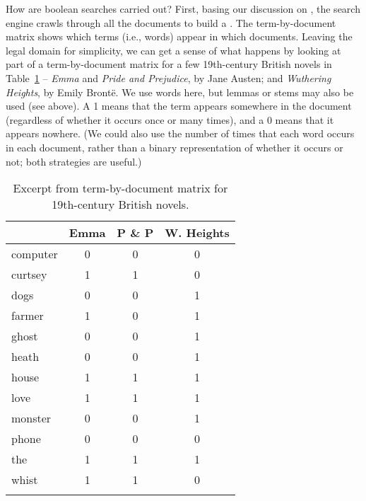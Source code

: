 How are boolean searches carried out?  First, basing our discussion on  \citet{manning-et-al:08}, the search engine crawls through all the documents to build a 
.  The term-by-document matrix
shows which terms (i.e., words) appear in which documents.  Leaving the legal domain for simplicity, we can get a sense of what happens by looking at
part of a term-by-document matrix for a few 19th-century British novels in
Table~\ref{fig:term-by-document} -- \textit{Emma} and \textit{Pride and Prejudice}, by Jane Austen; and \textit{Wuthering Heights}, by Emily Bront\"e.  We  use words here, but lemmas or stems may also be used (see above).  A 1 means that the term appears somewhere in the document (regardless of whether it occurs once or many times), and a 0 means that it appears nowhere.  (We could also use the number of times that each word occurs in each document, rather than a binary representation of whether it occurs or not; both strategies are useful.)

\begin{table}
\begin{tabular}{lccc}
\lsptoprule
           & Emma & P \& P & W. Heights \\ \midrule
computer & 0 & 0 & 0 \\
curtsey & 1 & 1 & 0 \\
dogs & 0 & 0 & 1 \\
farmer & 1 & 0 & 1 \\ 
ghost & 0 & 0 & 1 \\
heath & 0 & 0 & 1 \\ 
house & 1 & 1 & 1 \\
love & 1 & 1 & 1 \\
monster & 0 & 0 & 1 \\
phone & 0 & 0 & 0 \\
the & 1 & 1 & 1 \\
whist & 1 & 1 & 0 \\
\lspbottomrule
\end{tabular}
\caption{Excerpt from term-by-document matrix for 19th-century British novels.}
\label{fig:term-by-document}
\end{table}

